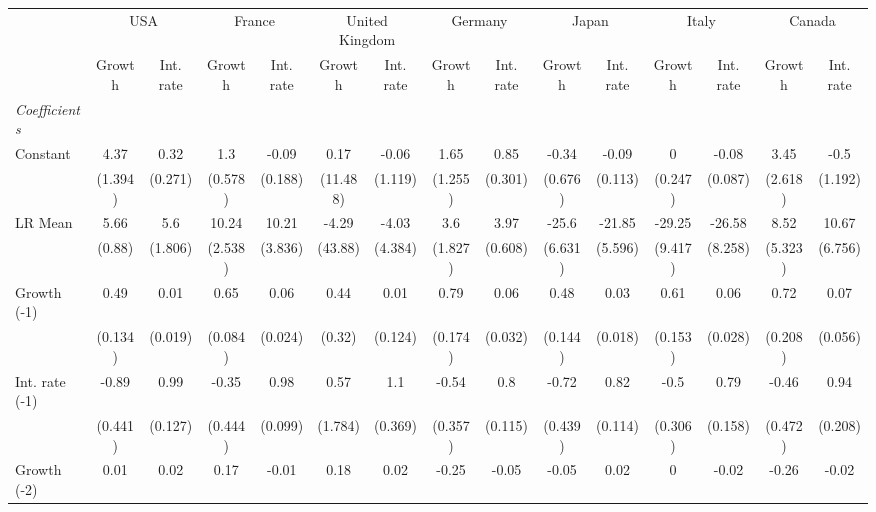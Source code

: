 \begin{table}[htbp] 
	\centering
	 \scriptsize
	\begin{tabular}{@{\extracolsep{4pt}}lcccccccccccccc@{}}		\hline\hline
		 		 & \multicolumn{2}{c}{USA} &\multicolumn{2}{c}{France} &\multicolumn{2}{c}{United Kingdom} &\multicolumn{2}{c}{Germany} &\multicolumn{2}{c}{Japan} &\multicolumn{2}{c}{Italy} &\multicolumn{2}{c}{Canada} \\ 
 		 & Growth 	 & Int. rate 	 & Growth 	 & Int. rate 	 & Growth 	 & Int. rate 	 & Growth 	 & Int. rate 	 & Growth 	 & Int. rate 	 & Growth 	 & Int. rate 	 & Growth 	 & Int. rate\\\cline{2-3}\cline{4-5}\cline{6-7}\cline{8-9}\cline{10-11}\cline{12-13}\cline{14-15}
\rule{0pt}{4ex} 
 \emph{Coefficients} 	  		 & 		 & 		 & 		 & 		 & 		 & 		 & 		 & 		 & 		 & 		 & 		 & 		 & 		 &\\ 
\quad Constant 	 & 4.37 	 & 0.32 	 & 1.3 	 & -0.09 	 & 0.17 	 & -0.06 	 & 1.65 	 & 0.85 	 & -0.34 	 & -0.09 	 & 0 	 & -0.08 	 & 3.45 	 & -0.5	 \\ 
 		 & (1.394) 	 & (0.271) 	 & (0.578) 	 & (0.188) 	 & (11.488) 	 & (1.119) 	 & (1.255) 	 & (0.301) 	 & (0.676) 	 & (0.113) 	 & (0.247) 	 & (0.087) 	 & (2.618) 	 & (1.192) 	 \\ 
\quad LR Mean 	 & 5.66 	 & 5.6 	 & 10.24 	 & 10.21 	 & -4.29 	 & -4.03 	 & 3.6 	 & 3.97 	 & -25.6 	 & -21.85 	 & -29.25 	 & -26.58 	 & 8.52 	 & 10.67	 \\ 
 		 & (0.88) 	 & (1.806) 	 & (2.538) 	 & (3.836) 	 & (43.88) 	 & (4.384) 	 & (1.827) 	 & (0.608) 	 & (6.631) 	 & (5.596) 	 & (9.417) 	 & (8.258) 	 & (5.323) 	 & (6.756) 	 \\ 
\quad Growth (-1) 	 &0.49 	 & 0.01 	 & 0.65 	 & 0.06 	 & 0.44 	 & 0.01 	 & 0.79 	 & 0.06 	 & 0.48 	 & 0.03 	 & 0.61 	 & 0.06 	 & 0.72 	 & 0.07	 \\ 
 		 & (0.134) 	 & (0.019) 	 & (0.084) 	 & (0.024) 	 & (0.32) 	 & (0.124) 	 & (0.174) 	 & (0.032) 	 & (0.144) 	 & (0.018) 	 & (0.153) 	 & (0.028) 	 & (0.208) 	 & (0.056) 	 \\ 
\quad Int. rate (-1) 	 &-0.89 	 & 0.99 	 & -0.35 	 & 0.98 	 & 0.57 	 & 1.1 	 & -0.54 	 & 0.8 	 & -0.72 	 & 0.82 	 & -0.5 	 & 0.79 	 & -0.46 	 & 0.94	 \\ 
 		 & (0.441) 	 & (0.127) 	 & (0.444) 	 & (0.099) 	 & (1.784) 	 & (0.369) 	 & (0.357) 	 & (0.115) 	 & (0.439) 	 & (0.114) 	 & (0.306) 	 & (0.158) 	 & (0.472) 	 & (0.208) 	 \\ 
\quad Growth (-2) 	 &0.01 	 & 0.02 	 & 0.17 	 & -0.01 	 & 0.18 	 & 0.02 	 & -0.25 	 & -0.05 	 & -0.05 	 & 0.02 	 & 0 	 & -0.02 	 & -0.26 	 & -0.02	 \\ 

\end{tabular}
\end{table}
